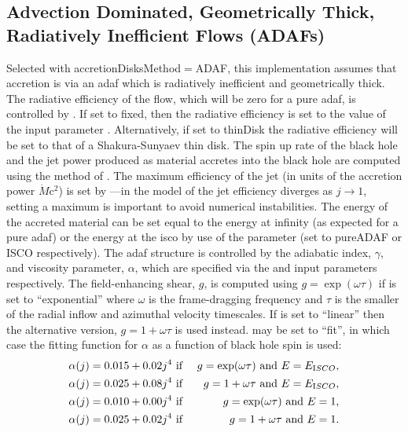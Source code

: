 \subsection{Advection Dominated, Geometrically Thick, Radiatively Inefficient Flows (ADAFs)}

Selected with {\normalfont \ttfamily accretionDisksMethod}$=${\normalfont \ttfamily ADAF}, this implementation assumes that accretion is via an \gls{adaf} \citep{narayan_advection-dominated_1994} which is radiatively inefficient and geometrically thick. The radiative efficiency of the flow, which will be zero for a pure \gls{adaf}, is controlled by {\normalfont \ttfamily [adafRadiativeEfficiencyType]}. If set to {\normalfont \ttfamily fixed}, then the radiative efficiency is set to the value of the input parameter {\normalfont \ttfamily [adafRadiativeEfficiency]}. Alternatively, if set to {\normalfont \ttfamily thinDisk} the radiative efficiency will be set to that of a Shakura-Sunyaev thin disk. The spin up rate of the black hole and the jet power produced as material accretes into the black hole are computed using the method of \cite{benson_maximum_2009}. The maximum efficiency of the jet (in units of the accretion power $\dot{M} {\mathrm c}^2$) is set by {\normalfont \ttfamily [adafJetEfficiencyMaximum]}---in the model of \cite{benson_maximum_2009} the jet efficiency diverges as $j\rightarrow 1$, setting a maximum 
is important to avoid numerical instabilities. The energy of the accreted material can be set equal to the energy at infinity (as expected for a pure \gls{adaf}) or the energy at the \gls{isco} by use of the {\normalfont \ttfamily [adafEnergyOption]} parameter (set to {\normalfont \ttfamily pureADAF} or {\normalfont \ttfamily ISCO} respectively). The \gls{adaf} structure is controlled by the adiabatic index, $\gamma$, and viscosity parameter, $\alpha$, which are specified via the {\normalfont \ttfamily [adafAdiabaticIndex]} and {\normalfont \ttfamily [adafViscosityOption]} input parameters respectively. The field-enhancing shear, $g$, is computed using $g=\exp(\omega \tau)$ if {\normalfont \ttfamily [adafFieldEnhanceType]} is set to ``exponential'' where $\omega$ is the frame-dragging frequency and $\tau$ is the smaller of the radial inflow and azimuthal velocity timescales. If  {\normalfont \ttfamily [adafFieldEnhanceType]} is set to ``linear'' then the alternative version, $g=1+\omega \tau$ is used instead. {\normalfont \ttfamily [adafViscosityOption]} may be set to ``{\normalfont \ttfamily fit}'', in which case the fitting function for $\alpha$ as a function of black hole 
spin is used:
\begin{eqnarray}
\alpha(j)=0.015+0.02 j^4 & \hbox{ if  }& g=\exp(\omega\tau) \hbox{ and } E=E_{\mathrm ISCO}, \\
\alpha(j)=0.025+0.08 j^4 & \hbox{ if } & g=1+\omega\tau \hbox{ and } E=E_{\mathrm ISCO}, \\
\alpha(j)=0.010+0.00 j^4 & \hbox{ if } & g=\exp(\omega\tau) \hbox{ and } E=1, \\
\alpha(j)=0.025+0.02 j^4 & \hbox{ if } & g=1+\omega\tau \hbox{ and } E=1.  
\end{eqnarray}

